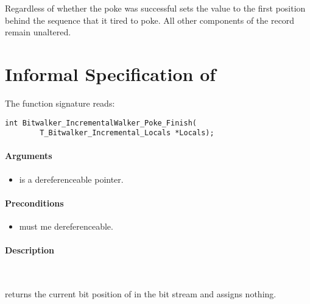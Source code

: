 Regardless of whether the poke was successful \pokenext sets the value   to the first position behind the sequence that it tired to poke.
 All other components of the record  remain unaltered.



\clearpage

\section{Informal Specification of }

 The function signature reads:\\[1em]

\begin{lstlisting}[style=acsl-block]
int Bitwalker_IncrementalWalker_Poke_Finish(
        T_Bitwalker_Incremental_Locals *Locals);
\end{lstlisting}

\paragraph{Arguments}
\begin{itemize}
   \item  {} is a dereferenceable pointer.
\end{itemize}

\paragraph{Preconditions}
\begin{itemize}
    \item  {} must me dereferenceable.
\end{itemize}

\paragraph{Description}~

\pokefinish  returns the current bit position of in the bit stream and assigns nothing.




